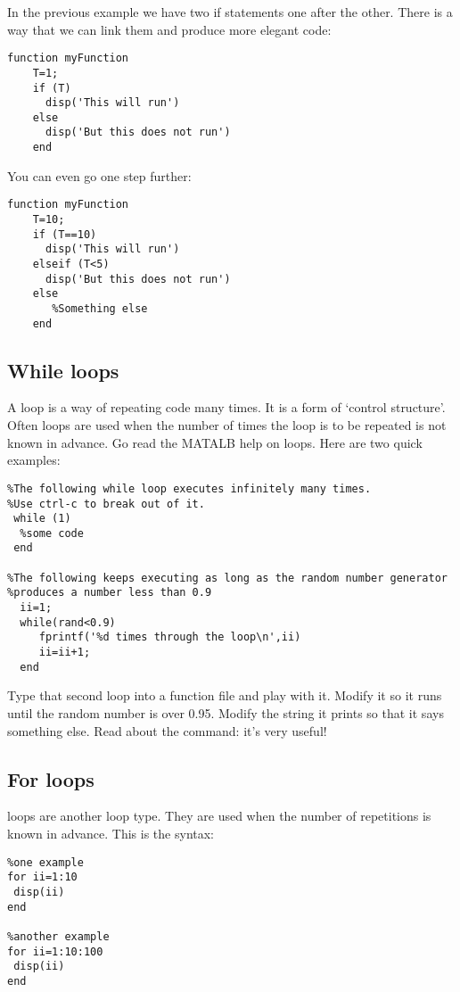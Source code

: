 \documentclass{article}
\begin{document}
In the previous example we have two if statements one after the other. There is a way that we can link them and produce more elegant code:
\begin{lstlisting}
function myFunction
    T=1;
	if (T)
	  disp('This will run')
	else
	  disp('But this does not run')
    end
\end{lstlisting}

You can even go one step further:

\begin{lstlisting}
function myFunction
    T=10;
	if (T==10)
	  disp('This will run')
	elseif (T<5)
	  disp('But this does not run')
    else
       %Something else
    end
\end{lstlisting}



\pagebreak
\subsection*{While loops}
A  loop is a way of repeating code many times. It is a form of `control structure'. Often  loops are used when the number of times the loop is to be repeated is not known in advance. Go read the MATALB help on  loops. Here are two quick examples:
\begin{lstlisting}
%The following while loop executes infinitely many times. 
%Use ctrl-c to break out of it.
 while (1)
  %some code
 end

%The following keeps executing as long as the random number generator
%produces a number less than 0.9
  ii=1; 
  while(rand<0.9)
     fprintf('%d times through the loop\n',ii)
     ii=ii+1; 
  end
\end{lstlisting}

Type that second loop into a function file and play with it. Modify it so it runs until the random number is over 0.95. Modify the string it prints so that it says something else. Read about the  command: it's very useful!

\subsection*{For loops}
 loops are another loop type. They are used when the number of repetitions is known in advance. This is the syntax:
\begin{lstlisting}
%one example
for ii=1:10
 disp(ii)
end

%another example
for ii=1:10:100
 disp(ii)
end
\end{lstlisting}
\end{document}

